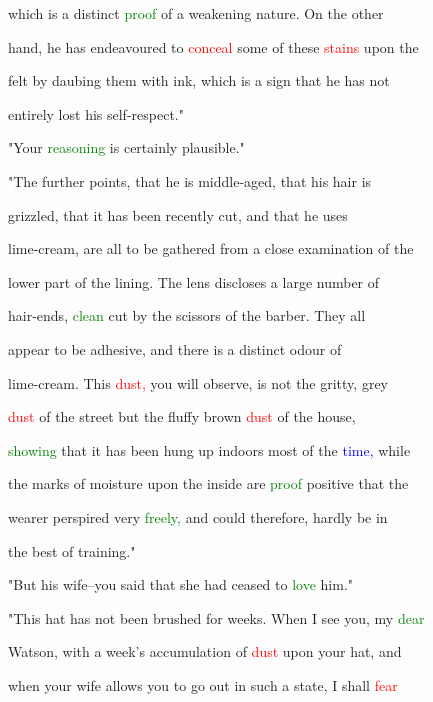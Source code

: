 which is a distinct \textcolor{green}{proof} of a weakening nature. On the other

 hand, he has endeavoured to \textcolor{red}{conceal} some of these \textcolor{red}{stains} upon the

 felt by daubing them with ink, which is a sign that he has not

 entirely \textcolor{BurntOrange}{lost} his self-respect."



 "Your \textcolor{green}{reasoning} is certainly plausible."



 "The further points, that he is middle-aged, that his hair is

 grizzled, that it has been recently cut, and that he uses

 lime-cream, are all to be gathered from a close \textcolor{BurntOrange}{examination} of the

 lower part of the lining. The lens discloses a large number of

 hair-ends, \textcolor{green}{clean} cut by the scissors of the barber. They all

 appear to be adhesive, and there is a distinct odour of

 lime-cream. This \textcolor{red}{dust,} you will observe, is not the gritty, grey

 \textcolor{red}{dust} of the street but the fluffy brown \textcolor{red}{dust} of the house,

 \textcolor{green}{showing} that it has been hung up indoors most of the \textcolor{blue}{time,} while

 the marks of moisture upon the inside are \textcolor{green}{proof} positive that the

 wearer perspired very \textcolor{green}{freely,} and could therefore, hardly be in

 the best of training."



 "But his wife--you said that she had ceased to \textcolor{green}{love} him."



 "This hat has not been brushed for weeks. When I see you, my \textcolor{green}{dear}

 Watson, with a week's accumulation of \textcolor{red}{dust} upon your hat, and

 when your wife allows you to go out in such a state, I shall \textcolor{red}{fear}

